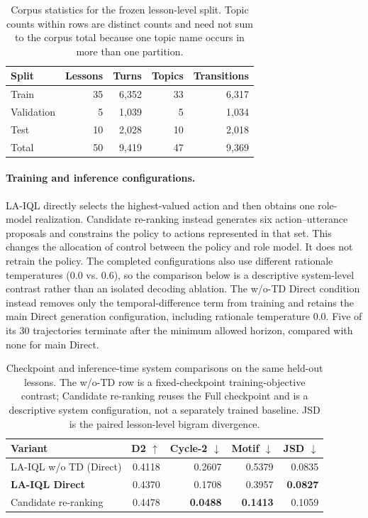 \documentclass[manuscript,review,anonymous]{acmart}
\begin{document}
\begin{table}[t]
\centering
\small
\setlength{\tabcolsep}{3pt}
\begin{tabular}{lrrrr}
\toprule
Split & Lessons & Turns & Topics & Transitions \\
\midrule
Train      & 35 & 6,352 & 33 & 6,317 \\
Validation & 5  & 1,039 & 5 & 1,034 \\
Test       & 10 & 2,028 & 10 & 2,018 \\
Total      & 50 & 9,419 & 47 & 9,369 \\
\bottomrule
\end{tabular}
\caption{Corpus statistics for the frozen lesson-level split. Topic counts
within rows are distinct counts and need not sum to the corpus total because
one topic name occurs in more than one partition.}
\label{tab:appendix-data-statistics}
\end{table}

\paragraph{Training and inference configurations.}
LA-IQL directly selects the highest-valued action and then obtains one
role-model realization. Candidate re-ranking instead generates six
action--utterance proposals and constrains the policy to actions represented in
that set. This changes the allocation of control between the policy and role
model. It does not retrain the policy. The completed configurations also use
different rationale temperatures (0.0 vs. 0.6), so the comparison below is a
descriptive system-level contrast rather than an isolated decoding ablation.
The w/o-TD Direct condition instead removes only the temporal-difference term
from training and retains the main Direct generation configuration, including
rationale temperature 0.0. Five of its 30 trajectories terminate after the
minimum allowed horizon, compared with none for main Direct.

\begin{table}[t]
\centering
\small
\setlength{\tabcolsep}{4pt}
\begin{tabular}{lrrrr}
\toprule
Variant & D2 $\uparrow$ & Cycle-2 $\downarrow$ & Motif $\downarrow$ & JSD $\downarrow$ \\
\midrule
LA-IQL w/o TD (Direct) & 0.4118 & 0.2607 & 0.5379 & 0.0835 \\
\textbf{LA-IQL Direct} & 0.4370 & 0.1708 & 0.3957 & \textbf{0.0827} \\
Candidate re-ranking & 0.4478 & \textbf{0.0488} & \textbf{0.1413} & 0.1059 \\
\bottomrule
\end{tabular}
\caption{Checkpoint and inference-time system comparisons on the same held-out
lessons. The w/o-TD row is a fixed-checkpoint training-objective contrast;
Candidate re-ranking reuses the Full checkpoint and is a descriptive system
configuration, not a separately trained baseline. JSD is the paired
lesson-level bigram divergence.}
\label{tab:appendix-ablation-results}
\end{table}
\end{document}
